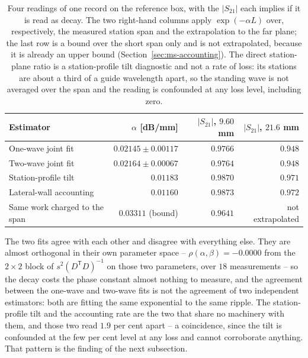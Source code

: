 \begin{table}[H]
  \centering
  \caption{Four readings of one record on the reference box, with the $|S_{21}|$ each implies if it is read as
  decay. The two right-hand columns apply $\exp(-\alpha L)$ over, respectively, the measured station span and the
  extrapolation to the far plane; the last row is a bound over the short span only and is not extrapolated, because
  it is already an upper bound (Section~\ref{sec:ms-accounting}). The direct station-plane ratio is a
  station-profile tilt diagnostic and not a rate of loss: its stations are about a third of a guide wavelength
  apart, so
  the standing wave is not averaged over the span and the reading is confounded at any loss level, including
  zero.}
  \label{tab:ms-alpha}
  \begin{tabular}{@{}lrrr@{}}
    \toprule
    Estimator & $\alpha$ [dB/mm] & $|S_{21}|$, $9.60$ mm & $|S_{21}|$, $21.6$ mm \\
    \midrule
    One-wave joint fit            & $0.02145 \pm 0.00117$ & $0.9766$ & $0.948$ \\
    Two-wave joint fit            & $0.02164 \pm 0.00067$ & $0.9764$ & $0.948$ \\
    Station-profile tilt          & $0.01183$             & $0.9870$ & $0.971$ \\
    Lateral-wall accounting       & $0.01160$             & $0.9873$ & $0.972$ \\
    Same work charged to the span & $0.03311$ (bound)     & $0.9641$ & not extrapolated \\
    \bottomrule
  \end{tabular}
\end{table}

The two fits agree with each other and disagree with everything else. They are almost orthogonal in their own
parameter space -- $\rho(\alpha,\beta) = -0.0000$ from the $2\times2$ block of $s^2(D^{\mathsf T}D)^{-1}$ on those
two parameters, over $18$ measurements -- so the decay costs the phase constant almost nothing to measure, and the
agreement between the one-wave and two-wave fits is not the agreement of two independent estimators: both are
fitting the same exponential to the same ripple. The station-profile tilt and the accounting rate are the two that
share no machinery with them, and those two read $1.9$ per cent apart -- a coincidence, since the tilt is
confounded at the few per cent level at any loss and cannot corroborate anything. That pattern is the finding of
the next subsection.

